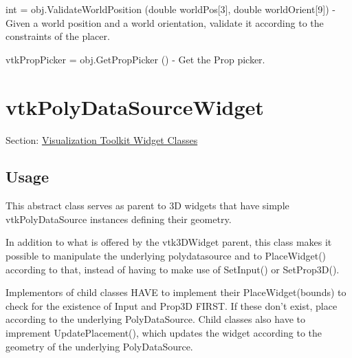 \begin{DoxyItemize}
\item {\ttfamily int = obj.\-Validate\-World\-Position (double world\-Pos\mbox{[}3\mbox{]}, double world\-Orient\mbox{[}9\mbox{]})} -\/ Given a world position and a world orientation, validate it according to the constraints of the placer.  
\item {\ttfamily vtk\-Prop\-Picker = obj.\-Get\-Prop\-Picker ()} -\/ Get the Prop picker.  
\end{DoxyItemize}\hypertarget{vtkwidgets_vtkpolydatasourcewidget}{}\section{vtk\-Poly\-Data\-Source\-Widget}\label{vtkwidgets_vtkpolydatasourcewidget}
Section\-: \hyperlink{sec_vtkwidgets}{Visualization Toolkit Widget Classes} \hypertarget{vtkwidgets_vtkxyplotwidget_Usage}{}\subsection{Usage}\label{vtkwidgets_vtkxyplotwidget_Usage}
This abstract class serves as parent to 3\-D widgets that have simple vtk\-Poly\-Data\-Source instances defining their geometry.

In addition to what is offered by the vtk3\-D\-Widget parent, this class makes it possible to manipulate the underlying polydatasource and to Place\-Widget() according to that, instead of having to make use of Set\-Input() or Set\-Prop3\-D().

Implementors of child classes H\-A\-V\-E to implement their Place\-Widget(bounds) to check for the existence of Input and Prop3\-D F\-I\-R\-S\-T. If these don't exist, place according to the underlying Poly\-Data\-Source. Child classes also have to imprement Update\-Placement(), which updates the widget according to the geometry of the underlying Poly\-Data\-Source.

